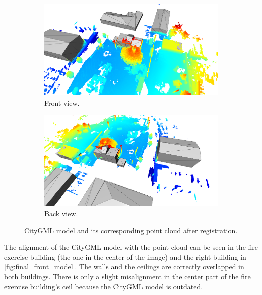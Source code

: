         \begin{figure}[htp]
            \centering
            \begin{subfigure}{1\textwidth}
                \centering
                \includegraphics[scale=0.15]{images/solution_images/final_front.png}
                \caption{Front view.}
                \label{fig:final_front_model}
            \end{subfigure}
            \hfill
            \begin{subfigure}{1\textwidth}
                \centering
                \includegraphics[scale=0.15]{images/solution_images/final_back.png}
                \caption{Back view.}
                \label{fig:final_back_model}
            \end{subfigure}
            \caption{CityGML model and its corresponding point cloud after registration.}
            \label{fig:final_CityGML}
        \end{figure}
        
        The alignment of the CityGML model with the point cloud can be seen in the fire exercise building (the one in the center of the image)
        and the right building in \autoref{fig:final_front_model}. The walls and the ceilings are correctly overlapped in both buildings.
        There is only a slight misalignment in the center part of the fire exercise building’s ceil because the CityGML model is outdated.

